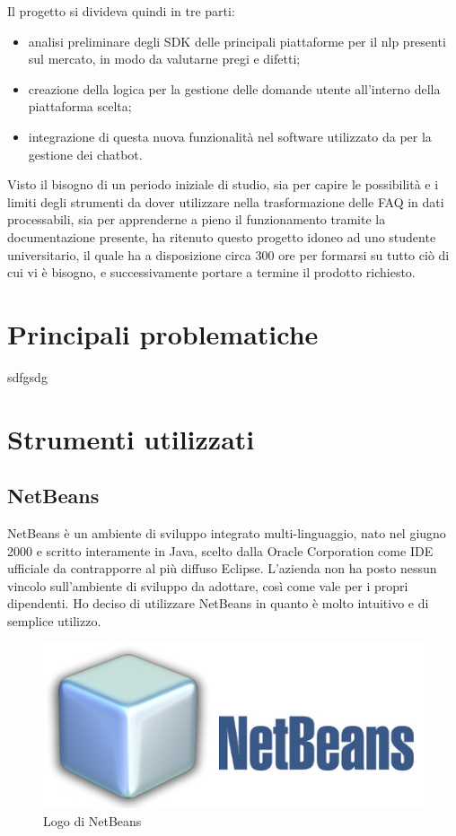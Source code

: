 Il progetto si divideva quindi in tre parti:
\begin{itemize}
	\item analisi preliminare degli SDK delle principali piattaforme per il \gls{nlp} presenti sul mercato, in modo da valutarne pregi e difetti;
	\item creazione della logica per la gestione delle domande utente all'interno della piattaforma scelta;
	\item integrazione di questa nuova funzionalità nel software utilizzato da \azienda{} per la gestione dei \gls{chatbot}. 
\end{itemize}
Visto il bisogno di un periodo iniziale di studio, sia per capire le possibilità e i limiti degli strumenti da dover utilizzare nella trasformazione delle FAQ in dati processabili, sia per apprenderne a pieno il funzionamento tramite la documentazione presente, \azienda{} ha ritenuto questo progetto idoneo ad uno studente universitario, il quale ha a disposizione circa 300 ore per formarsi su tutto ciò di cui vi è bisogno, e successivamente portare a termine il prodotto richiesto.
\section{Principali problematiche}
sdfgsdg
\section{Strumenti utilizzati}
\subsection{NetBeans}
NetBeans è un ambiente di sviluppo integrato multi-linguaggio, nato nel giugno 2000 e scritto interamente in Java, scelto dalla Oracle Corporation come IDE ufficiale da contrapporre al più diffuso Eclipse.
L'azienda non ha posto nessun vincolo sull'ambiente di sviluppo da adottare, così come vale per i propri dipendenti. Ho deciso di utilizzare NetBeans in quanto è molto intuitivo e di semplice utilizzo.
\begin{figure}[h]
	\centering
	\includegraphics[scale=0.4]{../Immagini/netbeans.jpg}
	\caption{Logo di NetBeans}
\end{figure}
